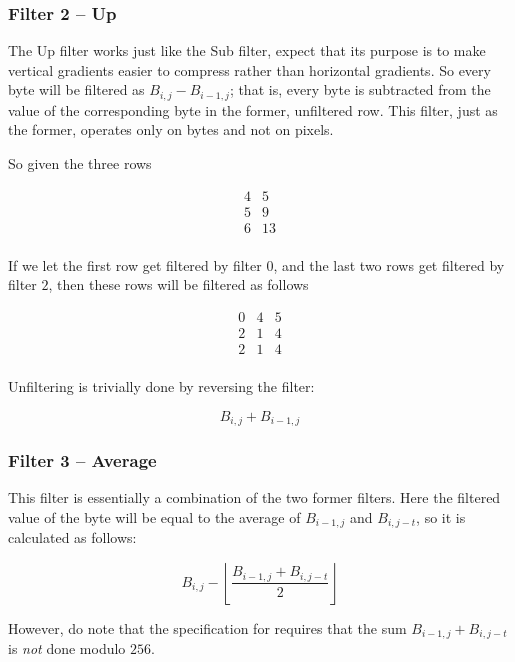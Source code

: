\subsubsection{Filter 2 -- Up}

The Up filter works just like the Sub filter, expect that its purpose
is to make vertical gradients easier to compress rather than
horizontal gradients. So every byte will be filtered as $B_{i,j} -
B_{i-1,j}$; that is, every byte is subtracted from the value of the
corresponding byte in the former, unfiltered row. This filter, just as
the former, operates only on bytes and not on pixels.

So given the three rows

\[
\begin{matrix}
  4 & 5 \\
  5 & 9 \\
  6 & 13 \\
\end{matrix}
\]

If we let the first row get filtered by filter $0$, and the last two
rows get filtered by filter $2$, then these rows will be filtered as
follows

\[
\begin{matrix}
  0 & 4 & 5 \\
  2 & 1 & 4 \\
  2 & 1 & 4 \\
\end{matrix}
\]

Unfiltering is trivially done by reversing the filter:

\begin{equation*}
  B_{i,j} + B_{i-1,j}
\end{equation*}

\subsubsection{Filter 3 -- Average}

This filter is essentially a combination of the two former
filters. Here the filtered value of the byte will be equal to the
average of $B_{i-1,j}$ and $B_{i,j-t}$, so it is calculated as
follows:

\begin{equation*}
  B_{i,j} - \left \lfloor \frac{B_{i-1,j} +
      B_{i,j-t}}{2} \right \rfloor
\end{equation*}

However, do note that the \png specification for requires that the sum
$B_{i-1,j} + B_{i,j-t}$ is \textit{not} done modulo $256$.

